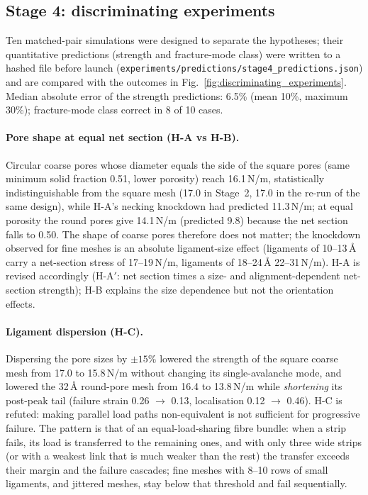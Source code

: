 \subsection{Stage 4: discriminating experiments}
Ten matched-pair simulations were designed to separate the hypotheses; their quantitative predictions (strength and fracture-mode class) were written to a hashed file before launch (\texttt{experiments/\allowbreak predictions/\allowbreak stage4\_\allowbreak predictions.json}) and are compared with the outcomes in Fig.~\ref{fig:discriminating_experiments}. Median absolute error of the strength predictions: 6.5\% (mean 10\%, maximum 30\%); fracture-mode class correct in 8 of 10 cases.

\paragraph{Pore shape at equal net section (H-A vs H-B).} Circular coarse pores whose diameter equals the side of the square pores (same minimum solid fraction 0.51, lower porosity) reach 16.1\,N/m, statistically indistinguishable from the square mesh (17.0 in Stage~2, 17.0 in the re-run of the same design), while H-A's necking knockdown had predicted 11.3\,N/m; at equal porosity the round pores give 14.1\,N/m (predicted 9.8) because the net section falls to 0.50. The shape of coarse pores therefore does not matter; the knockdown observed for fine meshes is an absolute ligament-size effect (ligaments of 10--13\,\AA{} carry a net-section stress of 17--19\,N/m, ligaments of 18--24\,\AA{} 22--31\,N/m). H-A is revised accordingly (H-A$'$: net section times a size- and alignment-dependent net-section strength); H-B explains the size dependence but not the orientation effects.

\paragraph{Ligament dispersion (H-C).} Dispersing the pore sizes by $\pm15\%$ lowered the strength of the square coarse mesh from 17.0 to 15.8\,N/m without changing its single-avalanche mode, and lowered the 32\,\AA{} round-pore mesh from 16.4 to 13.8\,N/m while \emph{shortening} its post-peak tail (failure strain 0.26 $\to$ 0.13, localisation 0.12 $\to$ 0.46). H-C is refuted: making parallel load paths non-equivalent is not sufficient for progressive failure. The pattern is that of an equal-load-sharing fibre bundle: when a strip fails, its load is transferred to the remaining ones, and with only three wide strips (or with a weakest link that is much weaker than the rest) the transfer exceeds their margin and the failure cascades; fine meshes with 8--10 rows of small ligaments, and jittered meshes, stay below that threshold and fail sequentially.

